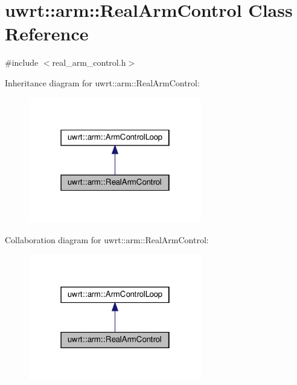 \hypertarget{classuwrt_1_1arm_1_1_real_arm_control}{}\section{uwrt\+:\+:arm\+:\+:Real\+Arm\+Control Class Reference}
\label{classuwrt_1_1arm_1_1_real_arm_control}


{\ttfamily \#include $<$real\+\_\+arm\+\_\+control.\+h$>$}



Inheritance diagram for uwrt\+:\+:arm\+:\+:Real\+Arm\+Control\+:
\nopagebreak
\begin{figure}[H]
\begin{center}
\leavevmode
\includegraphics[width=214pt]{classuwrt_1_1arm_1_1_real_arm_control__inherit__graph}
\end{center}
\end{figure}


Collaboration diagram for uwrt\+:\+:arm\+:\+:Real\+Arm\+Control\+:
\nopagebreak
\begin{figure}[H]
\begin{center}
\leavevmode
\includegraphics[width=214pt]{classuwrt_1_1arm_1_1_real_arm_control__coll__graph}
\end{center}
\end{figure}
